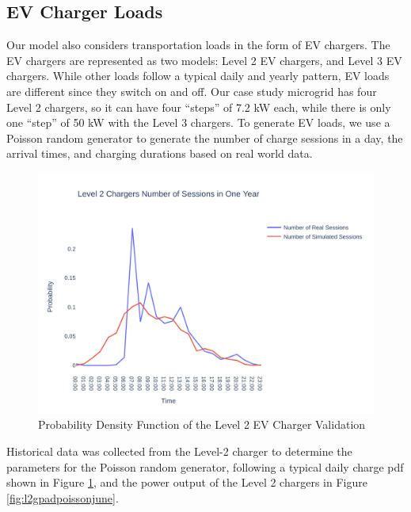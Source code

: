 \documentclass[conference]{IEEEtran}
\begin{document}
    \subsection{EV Charger Loads }
   		Our model also considers transportation loads in the form of EV chargers. The EV chargers are represented as two models: Level 2 EV chargers, and Level 3 EV chargers. While other loads follow a typical daily and yearly pattern, EV loads are different since they switch on and off. Our case study microgrid has four Level 2 chargers, so it can have four ``steps'' of 7.2 kW each, while there is only one ``step'' of 50 kW with the Level 3 chargers. To generate EV loads, we use a Poisson random generator to generate the number of charge sessions in a day, the arrival times, and charging durations based on real world data. 
		\begin{figure}[H]
			\centering
			\includegraphics[width=1\linewidth]{Fig/l2_avg_day_rand_poisson_1_hour_pdf}
			\caption{Probability Density Function of the Level 2 EV Charger Validation}
			\label{fig:l2avgdayrandpoisson1hourpdf}
		\end{figure}

		
		Historical data was collected from the Level-2 charger to determine the parameters for the Poisson random generator, following a typical daily charge pdf shown in Figure \ref{fig:l2avgdayrandpoisson1hourpdf}, and the power output of the Level 2 chargers in Figure \ref{fig:l2gpadpoissonjune}. 
		
\end{document}
